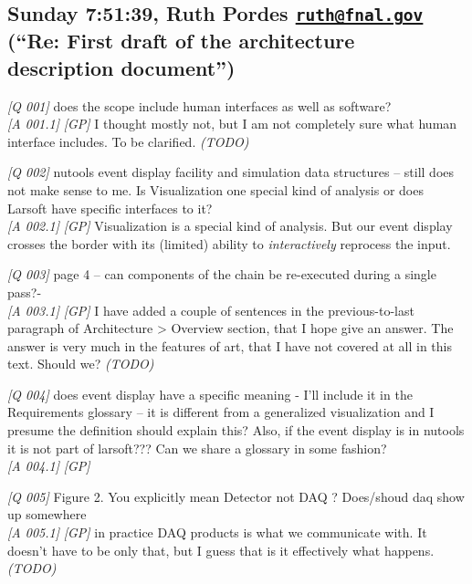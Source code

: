 

\subsection*{\texorpdfstring{Sunday 7:51:39, Ruth Pordes
\href{mailto:ruth@fnal.gov}{\nolinkurl{ruth@fnal.gov}} (``Re: First
draft of the architecture description
document'')}{Sunday 7:51:39, Ruth Pordes ruth@fnal.gov (``Re: First draft of the architecture description document'')}}\label{sunday-75139-ruth-pordes-ruthfnal.gov-re-first-draft-of-the-architecture-description-document}

\emph{{[}Q 001{]}} does the scope include human interfaces as well as
software?\\
\emph{{[}A 001.1{]}} \emph{{[}GP{]}} I thought mostly not, but I am not
completely sure what human interface includes. To be clarified.
\emph{(TODO)}

\emph{{[}Q 002{]}} nutools event display facility and simulation data
structures -- still does not make sense to me. Is Visualization one
special kind of analysis or does Larsoft have specific interfaces to
it?\\
\emph{{[}A 002.1{]}} \emph{{[}GP{]}} Visualization is a special kind of
analysis. But our event display crosses the border with its (limited)
ability to \emph{interactively} reprocess the input.

\emph{{[}Q 003{]}} page 4 -- can components of the chain be re-executed
during a single pass?-\\
\emph{{[}A 003.1{]}} \emph{{[}GP{]}} I have added a couple of sentences
in the previous-to-last paragraph of Architecture \textgreater{}
Overview section, that I hope give an answer. The answer is very much in
the features of art, that I have not covered at all in this text. Should
we? \emph{(TODO)}

\emph{{[}Q 004{]}} does event display have a specific meaning - I'll
include it in the Requirements glossary -- it is different from a
generalized visualization and I presume the definition should explain
this? Also, if the event display is in nutools it is not part of
larsoft??? Can we share a glossary in some fashion?\\
\emph{{[}A 004.1{]}} \emph{{[}GP{]}}

\emph{{[}Q 005{]}} Figure 2. You explicitly mean Detector not DAQ ?
Does/shoud daq show up somewhere\\
\emph{{[}A 005.1{]}} \emph{{[}GP{]}} in practice DAQ products is what we
communicate with. It doesn't have to be only that, but I guess that is
it effectively what happens. \emph{(TODO)}

